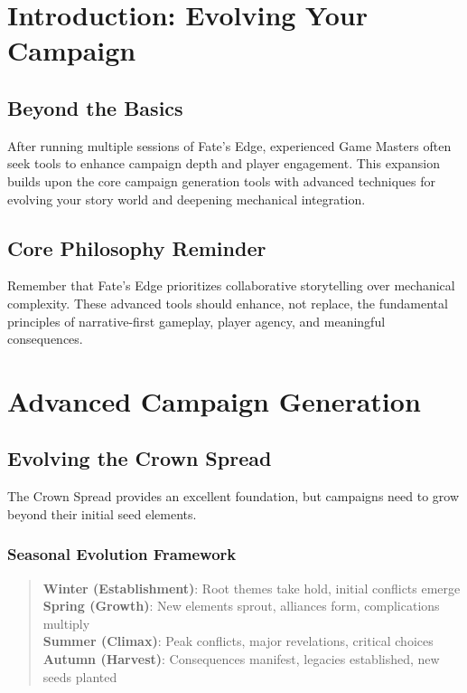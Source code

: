 \documentclass[11pt]{article}
\begin{document}




\tableofcontents
\newpage


\section{Introduction: Evolving Your Campaign}

\subsection{Beyond the Basics}

After running multiple sessions of Fate's Edge, experienced Game Masters often seek tools to enhance campaign depth and player engagement. This expansion builds upon the core campaign generation tools with advanced techniques for evolving your story world and deepening mechanical integration.

\subsection{Core Philosophy Reminder}

Remember that Fate's Edge prioritizes collaborative storytelling over mechanical complexity. These advanced tools should enhance, not replace, the fundamental principles of narrative-first gameplay, player agency, and meaningful consequences.

\section{Advanced Campaign Generation}

\subsection{Evolving the Crown Spread}

The Crown Spread provides an excellent foundation, but campaigns need to grow beyond their initial seed elements.

\subsubsection{Seasonal Evolution Framework}

\begin{quote}
\textbf{Winter (Establishment)}: Root themes take hold, initial conflicts emerge\\
\textbf{Spring (Growth)}: New elements sprout, alliances form, complications multiply\\
\textbf{Summer (Climax)}: Peak conflicts, major revelations, critical choices\\
\textbf{Autumn (Harvest)}: Consequences manifest, legacies established, new seeds planted
\end{quote}
\end{document}
